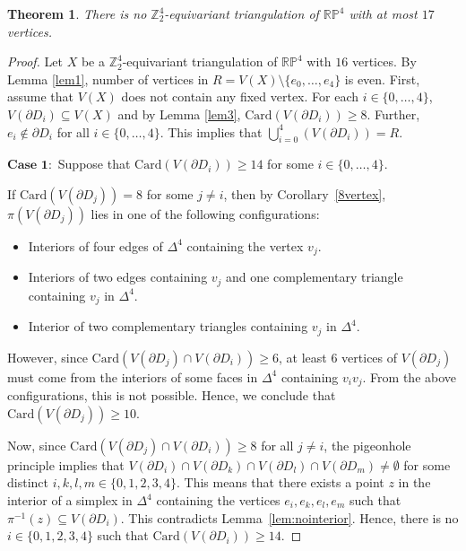 \documentclass[11pt]{amsart}
\numberwithin{equation}{section}
\newtheorem{theorem}{Theorem}[section]
\theoremstyle{definition}
\newcommand{\D}{\Delta}
\def \bb{\mathbb}
\def \ZZ{{\bb{Z}}}
\begin{document}
\sloppy
\begin{theorem}\label{thm7}
 There is no $\ZZ_2^4$-equivariant triangulation of $\mathbb{RP}^4$ with at most $17$ vertices.
\end{theorem}
\begin{proof}
Let $X$ be a $\ZZ_2^4$-equivariant triangulation of $\mathbb{RP}^4$ with $16$ vertices.  By Lemma \ref{lem1}, number of vertices in $R =V(X)\setminus \{e_0,\ldots,e_4\}$ is even. First, assume that $V(X)$ does not contain any fixed vertex. For each $i\in \{0,\ldots,4\}$, $V(\partial D_i)\subseteq V(X)$ and  by Lemma \ref{lem3}, $\mathrm{Card}( V(\partial D_i)) \geq 8$. Further, $e_i\notin \partial D_i$ for all $i\in \{0,\ldots,4\}$. This implies that $\bigcup_{i=0}^{4}(V(\partial D_i))=R$.


$\textbf{Case 1}:$ Suppose that $\mathrm{Card}(V(\partial  D_i)) \geq 14$  for some $i \in \{0, \ldots, 4\}$.

If $\mathrm{Card}(V(\partial D_j)) = 8$ for some $j\neq i$, then by Corollary~\ref{8vertex}, $\pi(V(\partial D_j))$ lies in one of the following configurations:  
\begin{itemize}
    \item[(i)] Interiors of four edges of $\D^4$ containing the vertex $v_j$.

    \item [(ii)]  Interiors of two edges containing $v_j$ and one complementary triangle containing $v_j$ in $\Delta^4$.

    \item  [(iii)] Interior of two complementary triangles containing $v_j$ in $\Delta^4$.
\end{itemize}
   
   However, since $\mathrm{Card}(V(\partial D_j) \cap V(\partial D_i)) \ge 6$, at least $6$ vertices of $V(\partial D_j)$ must come from the interiors of some faces in $\D^4$ containing $v_iv_j$. From the above configurations, this is not possible.
Hence, we conclude that $\mathrm{Card}(V(\partial D_j)) \ge 10$.

Now, since $\mathrm{Card}(V(\partial D_j) \cap V(\partial D_i)) \ge 8$ for all $j \neq i$, the pigeonhole principle implies that  
$V(\partial D_i) \cap V(\partial D_k) \cap V(\partial D_l) \cap V(\partial D_m) \neq \emptyset$  
for some distinct $i, k, l, m \in \{0,1,2,3,4\}$. This means that there exists a point $z$ in the interior of a simplex in $\D^4$ containing the vertices $e_i, e_k, e_l, e_m$ such that $\pi^{-1}(z) \subseteq V(\partial D_i)$. This contradicts Lemma~\ref{lem:nointerior}. Hence, there is no $i \in \{0,1,2,3,4\}$ such that $\mathrm{Card}(V(\partial D_i)) \ge 14$.




\end{proof}
\end{document}
